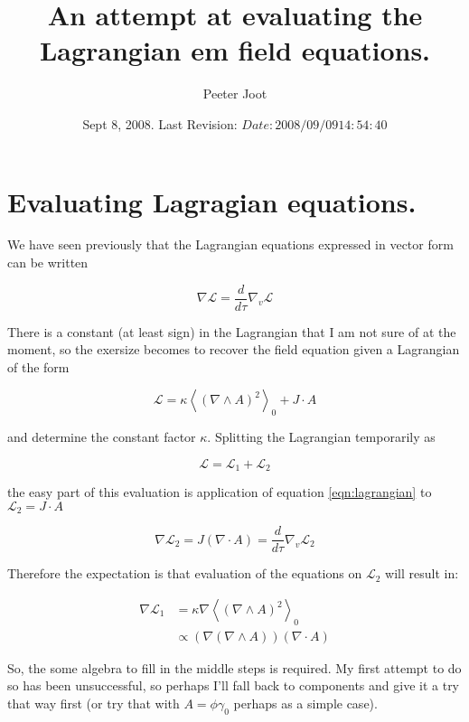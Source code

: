 \documentclass{article}
\title{ An attempt at evaluating the Lagrangian em field equations. }
\author{Peeter Joot}
\date{ Sept 8, 2008.  Last Revision: $Date: 2008/09/09 14:54:40 $ }
\newcommand{\LL}[0]{\mathcal{L}}
\newcommand{\gpgrade}[2] {{\left\langle{{#1}}\right\rangle}_{#2}}
\newcommand{\gpgradezero}[1] {\gpgrade{#1}{0}}
\newcommand{\grad}[0]{\nabla}
\begin{document}
\maketitle{}

\section{ Evaluating Lagragian equations. }

We have seen previously that the Lagrangian equations expressed in vector 
form can be written

\begin{equation}\label{eqn:lagrangian}
\grad \LL = \frac{d}{d\tau} \grad_v \LL
\end{equation}

There is a constant (at least sign) in the Lagrangian that I am not sure of
at the moment, so the exersize becomes to recover the field equation 
given a Lagrangian of the form

\begin{equation*}
\LL = \kappa \gpgradezero{ (\grad \wedge A)^2 } + J \cdot A
\end{equation*}

and determine the constant factor $\kappa$.  Splitting the Lagrangian temporarily as

\begin{equation*}
\LL = \LL_1 + \LL_2
\end{equation*}

the easy part of this evaluation is application of equation \ref{eqn:lagrangian} to $\LL_2 = J \cdot A$

\begin{equation}\label{eqn:maybewrong}
\grad \LL_2 = J (\grad \cdot A) = \frac{d}{d\tau} \grad_v \LL_2
\end{equation}

Therefore the expectation is that evaluation of the equations on $\LL_2$ will 
result in:

\begin{align*}
\grad \LL_1 
&= \kappa \grad \gpgradezero{ (\grad \wedge A)^2 } \\
&\propto (\grad (\grad \wedge A)) (\grad \cdot A)
\end{align*}

So, the some algebra to fill in the middle steps is required.  My
first attempt to do so has been unsuccessful, so perhaps I'll fall back
to components and give it a try that way first (or try that with $A = \phi \gamma_0$ perhaps as a simple case).
\end{document}

